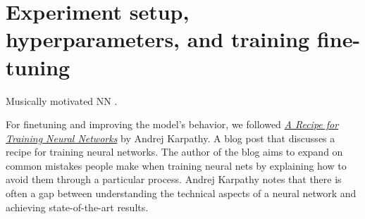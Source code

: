 \section{Experiment setup, hyperparameters, and training fine-tuning}


Musically motivated NN \cite{musicmotivCNN}.

For finetuning and improving the model's behavior, we followed \href{http://karpathy.github.io/2019/04/25/recipe/}{\textit{A Recipe for Training Neural Networks}} \cite{AndrejKarpathyHttp://karpathy.github.io/2019/04/25/recipe/} by Andrej Karpathy. A blog post that discusses a recipe for training neural networks. The author of the blog aims to expand on common mistakes people make when training neural nets by explaining how to avoid them through a particular process. Andrej Karpathy notes that there is often a gap between understanding the technical aspects of a neural network and achieving state-of-the-art results.
